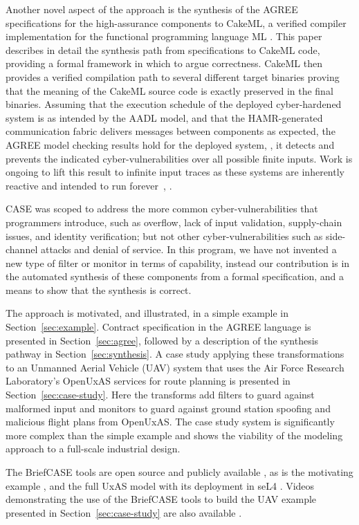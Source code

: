 Another novel aspect of the approach is the synthesis of the AGREE specifications for the high-assurance components to CakeML, a verified compiler implementation for the functional programming language ML \cite{cakeml}. This paper describes in detail the synthesis path from specifications to CakeML code, providing a formal framework in which to argue correctness. CakeML then provides a verified compilation path to several different target binaries proving that the meaning of the CakeML source code is exactly preserved in the final binaries. Assuming that the execution schedule of the deployed cyber-hardened system is as intended by the AADL model, and that the HAMR-generated communication fabric delivers messages between components as expected, the AGREE model checking results hold for the deployed system, \ie, it detects and prevents the indicated cyber-vulnerabilities over all possible finite inputs. Work is ongoing to lift this result to infinite input traces as these systems are inherently reactive and intended to run forever~\cite{case-verified-filter}, \cite{cakeml-space-cost}.

CASE was scoped to address the more common cyber-vulnerabilities that programmers introduce, such as overflow, lack of input validation, supply-chain issues, and identity verification; but not other cyber-vulnerabilities such as side-channel attacks and denial of service.
In this program, we have not invented a new type of filter or monitor in terms of capability, instead our contribution is in the automated synthesis of these components from a formal specification, and a means to show that the synthesis is correct.

The approach is motivated, and illustrated, in a simple example in Section~\ref{sec:example}. Contract specification in the AGREE language is presented in Section~\ref{sec:agree}, followed by a description of the synthesis pathway in Section~\ref{sec:synthesis}. A case study applying these transformations to an Unmanned Aerial Vehicle (UAV) system that uses the Air Force Research Laboratory's OpenUxAS services for route planning is presented in Section~\ref{sec:case-study}. Here the transforms add filters to guard against malformed input and monitors to guard against ground station spoofing and malicious flight plans from OpenUxAS. The case study system is significantly more complex than the simple example and shows the viability of the modeling approach to a full-scale industrial design. 

The BriefCASE tools are open source and publicly available \cite{fmide}, as is the motivating example \cite{repo}, and the full UxAS model with its deployment in seL4 \cite{phase2, camkes}.  Videos demonstrating the use of the BriefCASE tools to build the UAV example presented in Section~\ref{sec:case-study} are also available \cite{case}. 
